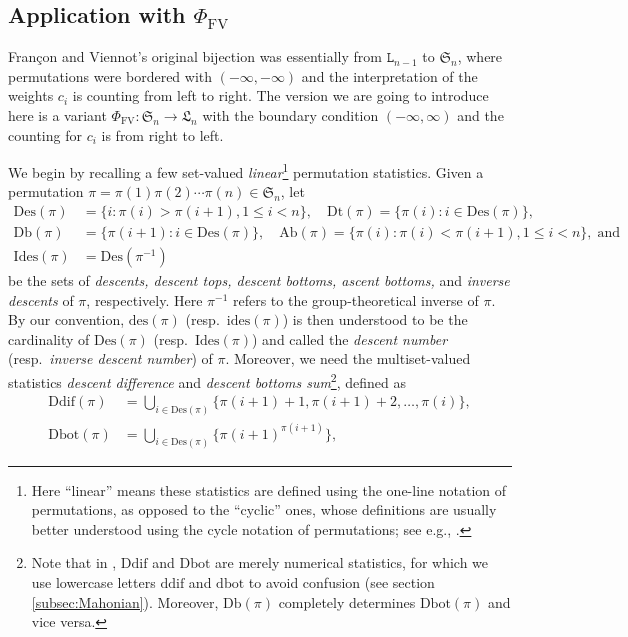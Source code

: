\documentclass[12pt]{amsart}
\numberwithin{equation}{section}
\theoremstyle{plain}
\theoremstyle{definition}
\def\FV{\mathrm{FV}}
\def\SS{\mathfrak{S}}
\def\LH{\mathfrak{L}}
\def\des{\mathrm{des}}
\def\ides{\mathrm{ides}}
\def\Des{\mathrm{Des}}
\def\Db{\mathrm{Db}}
\def\Ab{\mathrm{Ab}}
\def\Id{\mathrm{Ides}}
\def\Dt{\mathrm{Dt}}
\def\Ddif{\mathrm{Ddif}}
\def\ddif{\mathrm{ddif}}
\def\Dbot{\mathrm{Dbot}}
\def\dbot{\mathrm{dbot}}
\begin{document}
\subsection{Application with \texorpdfstring{$\Phi_{\FV}$}{Fran\c con-Viennot's bijection}}\label{subsec:FV}

Fran\c con and Viennot's original bijection \cite[Theorem 2.2]{FV} was essentially from $\mathtt{L}_{n-1}$ to $\SS_n$, where permutations were bordered with $(-\infty,-\infty)$ and the interpretation of the weights $c_i$ is counting from left to right. The version we are going to introduce here is a variant $\Phi_{\FV}:\SS_n\rightarrow \LH_n$ with the boundary condition $(-\infty,\infty)$ and the counting for $c_i$ is from right to left.

We begin by recalling a few set-valued {\em linear}\footnote{Here ``linear'' means these statistics are defined using the one-line notation of permutations, as opposed to the ``cyclic'' ones, whose definitions are usually better understood using the cycle notation of permutations; see e.g., \cite{CSZ}.} permutation statistics. Given a permutation $\pi=\pi(1) \pi(2) \cdots \pi(n) \in \SS_n$, let
\begin{align*}
   \Des(\pi) &=\{i : \pi(i) > \pi(i+1), 1\le i<n\}, \quad \Dt(\pi)  =\{\pi(i) : i\in\Des(\pi)\},  \\[3pt]
  \Db(\pi) &=\{\pi(i+1) : i\in\Des(\pi)\},  \quad  \Ab(\pi) =\{\pi(i) : \pi(i)< \pi(i+1), 1\le i<n\},\; \text{and} \\[3pt]
  \Id(\pi)&=\Des(\pi^{-1})
\end{align*}
be the sets of {\em descents, descent tops, descent bottoms, ascent bottoms,} and {\em inverse descents} of $\pi$, respectively. Here $\pi^{-1}$ refers to the group-theoretical inverse of $\pi$. By our convention, $\des(\pi)$ (resp.~$\ides(\pi)$) is then understood to be the cardinality of $\Des(\pi)$ (resp.~$\Id(\pi)$) and called the {\em descent number} (resp.~{\em inverse descent number}) of $\pi$. Moreover, we need the multiset-valued statistics {\em descent difference} and {\em descent bottoms sum}\footnote{Note that in \cite[Definition 3]{CSZ}, $\Ddif$ and $\Dbot$ are merely numerical statistics, for which we use lowercase letters $\ddif$ and $\dbot$ to avoid confusion (see section \ref{subsec:Mahonian}). Moreover, $\Db(\pi)$ completely determines $\Dbot(\pi)$ and vice versa.}, defined as
\begin{align*}
\Ddif(\pi) &=\bigcup_{i\in\Des(\pi)}\{\pi(i+1)+1,\pi(i+1)+2,\ldots,\pi(i)\},\\
\Dbot(\pi) &=\bigcup_{i\in\Des(\pi)}\{\pi(i+1)^{\pi(i+1)}\},
\end{align*}
\end{document}
